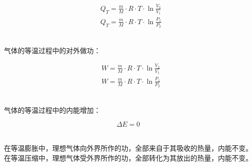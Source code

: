 \documentclass[UTF8]{ctexart}
\begin{document}
    \begin{large}
        \begin{align*}
            &Q_T=\frac{m}{M}\cdot R\cdot T\cdot\ln{\frac{V_2}{V_1}}\\[2mm]
            &Q_T=\frac{m}{M}\cdot R\cdot T\cdot\ln{\frac{P_1}{P_2}}
        \end{align*}
    \end{large}\\
    气体的等温过程中的对外做功：
    \begin{large}
        \begin{align*}
            &W=\frac{m}{M}\cdot R\cdot T\cdot\ln{\frac{V_2}{V_1}}\\[2mm]
            &W=\frac{m}{M}\cdot R\cdot T\cdot\ln{\frac{P_1}{P_2}}
        \end{align*}
    \end{large}\\
    气体的等温过程中的内能增加：
    \begin{large}
        \begin{equation*}
            \Delta E=0
        \end{equation*}
    \end{large}\\
    在等温膨胀中，理想气体向外界所作的功，全部来自于其吸收的热量，内能不变。\\[3mm]
    在等温压缩中，理想气体受外界所作的功，全部转化为其放出的热量，内能不变。

\newpage
\end{document}

